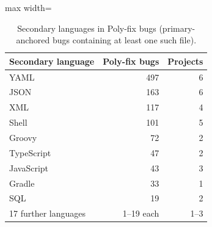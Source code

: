 \begin{table}[t]
\caption{Secondary languages in Poly-fix bugs (primary-anchored bugs containing at least one such file).}
\label{tab:secondary}
\small
\begin{adjustbox}{max width=\linewidth}\begin{tabular}{lrr}
\toprule
Secondary language & Poly-fix bugs & Projects \\
\midrule
YAML & 497 & 6 \\
JSON & 163 & 6 \\
XML & 117 & 4 \\
Shell & 101 & 5 \\
Groovy & 72 & 2 \\
TypeScript & 47 & 2 \\
JavaScript & 43 & 3 \\
Gradle & 33 & 1 \\
SQL & 19 & 2 \\
17 further languages & 1--19 each & 1--3 \\
\bottomrule
\end{tabular}\end{adjustbox}
\end{table}
